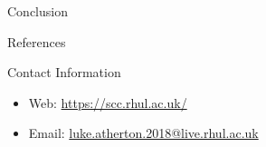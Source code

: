 \documentclass[final]{beamer}
\newlength{\onecolwid}
\begin{document}
\begin{frame}[t]
\begin{columns}[t]
\begin{column}{\onecolwid}
\begin{block}{Conclusion}
\end{block}

\vspace*{1cm}
\begin{block}{References}

\nocite{*} %
\small{
}

\end{block}



\begin{alertblock}{Contact Information}

\begin{itemize}
\item Web: \href{https://scc.rhul.ac.uk/}{https://scc.rhul.ac.uk/}
\item Email: \href{luke.atherton.2018@live.rhul.ac.uk}{luke.atherton.2018@live.rhul.ac.uk}
\end{itemize}

\end{alertblock}


\end{column} %

\end{columns} %

\end{frame} %
\end{document}
